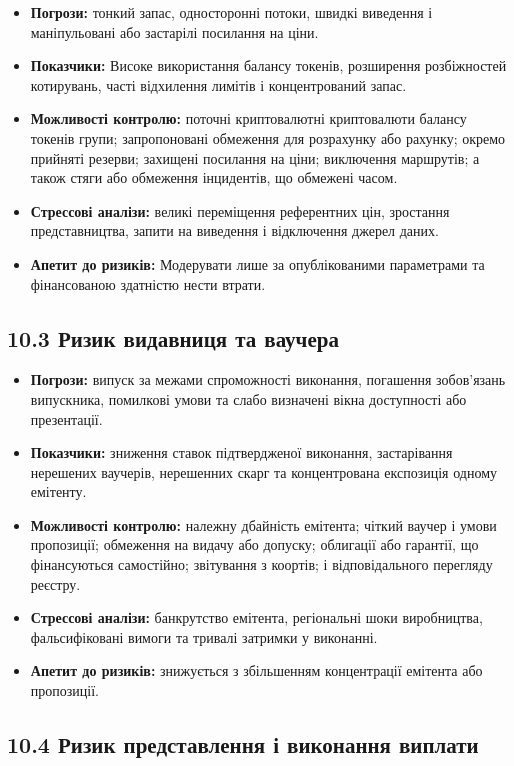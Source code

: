 \documentclass[11pt]{article}
\begin{document}
\begin{itemize}[leftmargin=*]
\item \textbf{Погрози:} тонкий запас, односторонні потоки, швидкі виведення і маніпульовані або застарілі посилання на ціни.
\item \textbf{Показчики:} Високе використання балансу токенів, розширення розбіжностей котирувань, часті відхилення лимітів і концентрований запас.
\item \textbf{Можливості контролю:} поточні криптовалютні криптовалюти балансу токенів групи; запропоновані обмеження для розрахунку або рахунку; окремо прийняті резерви; захищені посилання на ціни; виключення маршрутів; а також стяги або обмеження інцидентів, що обмежені часом.
\item \textbf{Стрессові аналізи:} великі переміщення референтних цін, зростання представництва, запити на виведення і відключення джерел даних.
\item \textbf{Апетит до ризиків:} Модерувати лише за опублікованими параметрами та фінансованою здатністю нести втрати.
\end{itemize}
\subsection*{10.3 Ризик видавниця та ваучера}

\begin{itemize}[leftmargin=*]
\item \textbf{Погрози:} випуск за межами спроможності виконання, погашення зобов'язань випускника, помилкові умови та слабо визначені вікна доступності або презентації.
\item \textbf{Показчики:} зниження ставок підтвердженої виконання, застарівання нерешених ваучерів, нерешенних скарг та концентрована експозиція одному емітенту.
\item \textbf{Можливості контролю:} належну дбайність емітента; чіткий ваучер і умови пропозиції; обмеження на видачу або допуску; облигації або гарантії, що фінансуються самостійно; звітування з коортів; і відповідального перегляду реєстру.
\item \textbf{Стрессові аналізи:} банкрутство емітента, регіональні шоки виробництва, фальсифіковані вимоги та тривалі затримки у виконанні.
\item \textbf{Апетит до ризиків:} знижується з збільшенням концентрації емітента або пропозиції.
\end{itemize}
\subsection*{10.4 Ризик представлення і виконання виплати}
\end{document}

